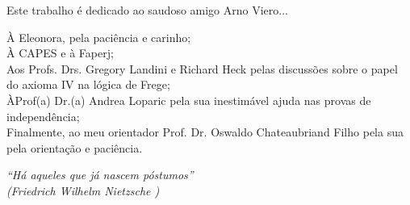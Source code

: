 \documentclass[12pt]{abntex2}
\begin{document}
 
\imprimircapa 
\imprimirfolhaderosto 

\begin{dedicatoria} 
\vspace*{\fill} 
Este trabalho é dedicado ao saudoso amigo Arno Viero... 
\vspace*{\fill} 
\end{dedicatoria} 
\begin{agradecimentos} 
À Eleonora, pela paciência e carinho;\\ 
À CAPES e à Faperj;\\ 
Aos Profs. Drs. Gregory Landini e Richard Heck pelas discussões sobre o papel do axioma IV na lógica de Frege;\\ 
ÀProf(a) Dr.(a) Andrea Loparic pela sua inestimável ajuda nas provas de independência;\\ 
Finalmente, ao meu orientador Prof. Dr. Oswaldo Chateaubriand Filho pela sua pela orientação e paciência. 
\end{agradecimentos} 
\begin{epigrafe} 
\vspace*{\fill} 
\begin{flushright} 
\textit{``Há aqueles que já nascem póstumos''\\ (Friedrich Wilhelm Nietzsche )} 
\end{flushright} 
\end{epigrafe} 
\end{document}
